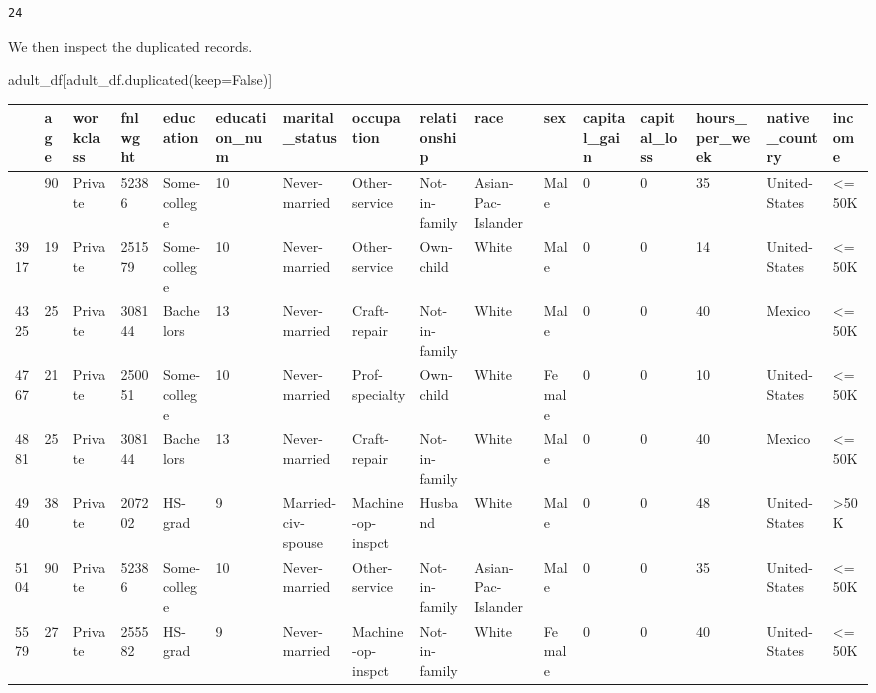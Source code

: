 \documentclass[
  letterpaper,
  DIV=11,
  numbers=noendperiod]{scrartcl}
\newenvironment{Shaded}{\begin{snugshade}}{\end{snugshade}}
\newcommand{\NormalTok}[1]{\textcolor[rgb]{0.00,0.23,0.31}{#1}}
\newcommand{\OperatorTok}[1]{\textcolor[rgb]{0.37,0.37,0.37}{#1}}
\newcommand{\VariableTok}[1]{\textcolor[rgb]{0.07,0.07,0.07}{#1}}
\begin{document}
\begin{verbatim}
24
\end{verbatim}

We then inspect the duplicated records.

\begin{Shaded}
\begin{Highlighting}[]
\NormalTok{adult\_df[adult\_df.duplicated(keep}\OperatorTok{=}\VariableTok{False}\NormalTok{)]}
\end{Highlighting}
\end{Shaded}

\begin{longtable}[]{@{}llllllllllllllll@{}}
\toprule\noalign{}
& age & workclass & fnlwght & education & education\_num &
marital\_status & occupation & relationship & race & sex & capital\_gain
& capital\_loss & hours\_per\_week & native\_country & income \\
\midrule\noalign{}
\endhead
\bottomrule\noalign{}
\endlastfoot
2303 & 90 & Private & 52386 & Some-college & 10 & Never-married &
Other-service & Not-in-family & Asian-Pac-Islander & Male & 0 & 0 & 35 &
United-States & \textless=50K \\
3917 & 19 & Private & 251579 & Some-college & 10 & Never-married &
Other-service & Own-child & White & Male & 0 & 0 & 14 & United-States &
\textless=50K \\
4325 & 25 & Private & 308144 & Bachelors & 13 & Never-married &
Craft-repair & Not-in-family & White & Male & 0 & 0 & 40 & Mexico &
\textless=50K \\
4767 & 21 & Private & 250051 & Some-college & 10 & Never-married &
Prof-specialty & Own-child & White & Female & 0 & 0 & 10 & United-States
& \textless=50K \\
4881 & 25 & Private & 308144 & Bachelors & 13 & Never-married &
Craft-repair & Not-in-family & White & Male & 0 & 0 & 40 & Mexico &
\textless=50K \\
4940 & 38 & Private & 207202 & HS-grad & 9 & Married-civ-spouse &
Machine-op-inspct & Husband & White & Male & 0 & 0 & 48 & United-States
& \textgreater50K \\
5104 & 90 & Private & 52386 & Some-college & 10 & Never-married &
Other-service & Not-in-family & Asian-Pac-Islander & Male & 0 & 0 & 35 &
United-States & \textless=50K \\
5579 & 27 & Private & 255582 & HS-grad & 9 & Never-married &
Machine-op-inspct & Not-in-family & White & Female & 0 & 0 & 40 &
United-States & \textless=50K \\

\end{longtable}
\end{document}
